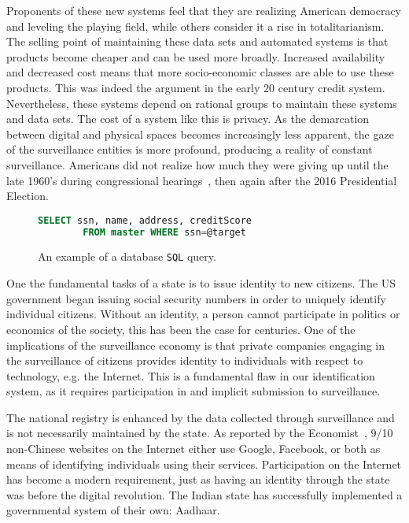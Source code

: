 Proponents of these new systems feel that they are realizing American democracy
and leveling the playing field, while others consider it a rise in
totalitarianism. The selling point of maintaining these data sets and
automated systems is that products become cheaper and can be used more broadly.
Increased availability and decreased cost means that more socio-economic
classes are able to use these products. This was indeed the argument in the
early 20 century credit system. Nevertheless, these systems depend on
rational groups to maintain these systems and data sets. The cost of a system
like this is privacy. As the demarcation between digital and physical spaces
becomes increasingly less apparent, the gaze of the surveillance entities is
more profound, producing a reality of constant surveillance. Americans did not
realize how much they were giving up until the late 1960's during congressional
hearings~\cite{lauer2017creditworthy}, then again after the 2016 Presidential
Election.

\begin{figure}[h]
\begin{lstlisting}[language=SQL, basicstyle=\sffamily]
		SELECT ssn, name, address, creditScore
		FROM master WHERE ssn=@target
\end{lstlisting}
\caption{An example of a database \texttt{SQL} query.}
\label{fig:sql}
\end{figure}


One the fundamental tasks of a state is to issue identity to new citizens. The
US government began issuing social security numbers in order to uniquely identify
individual citizens. Without an identity, a person cannot participate in politics or economics of the
society, this has been the case for centuries. One of the implications of the
surveillance economy is that private companies engaging in the surveillance
of citizens provides identity to individuals with respect to technology, e.g.
the Internet. This is a fundamental flaw in our identification system, as it
requires participation in and implicit submission to surveillance.

The national registry is enhanced by the data collected through surveillance
and is not necessarily maintained by the state. As reported by the
Economist~\cite{identity2018economist}, 9/10
non-Chinese websites on the Internet either use Google, Facebook, or both as means of
identifying individuals using their services. Participation on the Internet has
become a modern requirement, just as having an identity through the state was
before the digital revolution. The Indian state has successfully implemented
a governmental system of their own: Aadhaar.

